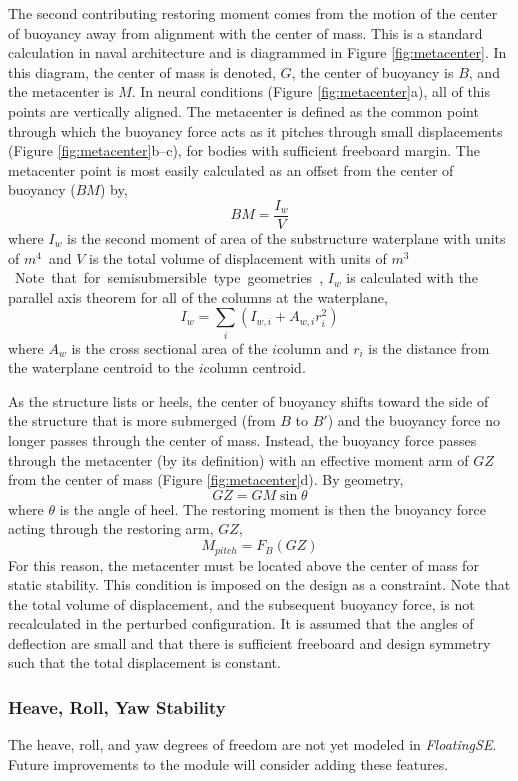 The second contributing restoring moment comes from the motion of the
center of buoyancy away from alignment with the center of mass.  This is
a standard calculation in naval architecture \citep{thiagarajan2014} and is
diagrammed in Figure \ref{fig:metacenter}.  In this diagram, the center
of mass is denoted, $G$, the center of buoyancy is $B$, and the
metacenter is $M$.  In neural conditions (Figure \ref{fig:metacenter}a),
all of this points are vertically aligned.  The metacenter is defined as
the common point through which the buoyancy force acts as it pitches
through small displacements (Figure \ref{fig:metacenter}b--c), for bodies
with sufficient freeboard margin.  The metacenter point is most easily
calculated as an offset from the center of buoyancy ($BM$) by,
\[
  BM = \frac{I_w}{V}
\]
where $I_w$ is the second moment of area of the substructure waterplane
with units of \unit{$m^4$} and $V$ is the total volume of displacement
with units of \unit{$m^3$}.  Note that for semisubmersible type
geometries, $I_w$ is calculated with the parallel axis theorem for all
of the columns at the waterplane,
\[
  I_w = \sum_i \left( I_{w,i} + A_{w,i}r_i^2 \right)
\]
where $A_w$ is the cross sectional area of the $i$\th column and $r_i$
is the distance from the waterplane centroid to the $i$\th column centroid.

As the structure lists or heels, the center of buoyancy shifts toward
the side of the structure that is more submerged (from $B$ to $B'$) and
the buoyancy force no longer passes through the center of mass.
Instead, the buoyancy force passes through the metacenter (by its
definition) with an effective moment arm of $GZ$ from the center of mass
(Figure \ref{fig:metacenter}d).  By geometry,
\[
GZ = GM \sin \theta
\]
where $\theta$ is the angle of heel.  The restoring moment is then the
buoyancy force acting through the restoring arm, $GZ$,
\[
  M_{pitch} = F_B \left(GZ\right)
\]
For this reason, the metacenter must be located above the center of
mass for static stability.  This condition is imposed on the design as a
constraint.  Note that the total volume of displacement, and the
subsequent buoyancy force, is not recalculated in the perturbed
configuration.  It is assumed that the angles of deflection are small
and that there is sufficient freeboard and design symmetry such that the
total displacement is constant.

\subsubsection{Heave, Roll, Yaw Stability}
The heave, roll, and yaw degrees of freedom are not yet modeled in
\textit{FloatingSE}.  Future improvements to the module will consider adding
these features.

